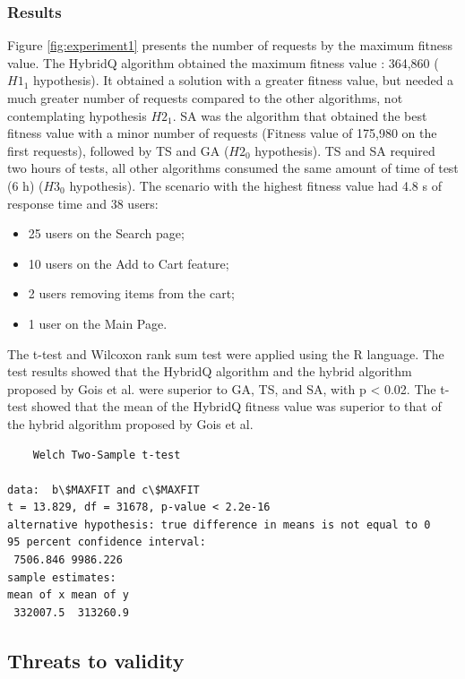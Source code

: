 \documentclass{bmcart}
\begin{document}
\subsubsection{Results}

Figure \ref{fig:experiment1} presents the number of requests by the maximum fitness value. The HybridQ algorithm obtained the maximum fitness value : 364,860 ($H1_{1}$ hypothesis). It obtained a solution with a greater fitness value, but needed a much greater number of requests compared to the other algorithms, not contemplating hypothesis $H2_{1}$. SA was the algorithm that obtained the best fitness value with a minor number of requests (Fitness value of 175,980 on the first requests), followed by TS and GA ($H2_{0}$ hypothesis). TS and SA required two hours of tests, all other algorithms consumed the same amount of time of test (6 h) ($H3_{0}$ hypothesis). The scenario with the highest fitness value had 4.8 s of response time and 38 users:

\begin{itemize}
\item 25 users on the Search page;
\item 10 users on the Add to Cart feature;
\item 2 users removing items from the cart;
\item 1 user on the Main Page. 
\end{itemize}

The t-test and Wilcoxon rank sum test were applied using the R language. The test results showed that the HybridQ algorithm and the hybrid algorithm proposed by Gois et al. were superior to GA, TS, and SA, with p < 0.02. The t-test showed that the mean of the HybridQ fitness value was superior to that of the hybrid algorithm proposed by Gois et al.

\begin{lstlisting}
	Welch Two-Sample t-test

data:  b\$MAXFIT and c\$MAXFIT
t = 13.829, df = 31678, p-value < 2.2e-16
alternative hypothesis: true difference in means is not equal to 0
95 percent confidence interval:
 7506.846 9986.226
sample estimates:
mean of x mean of y 
 332007.5  313260.9 

\end{lstlisting}



\subsection{Threats to validity}
\end{document}
